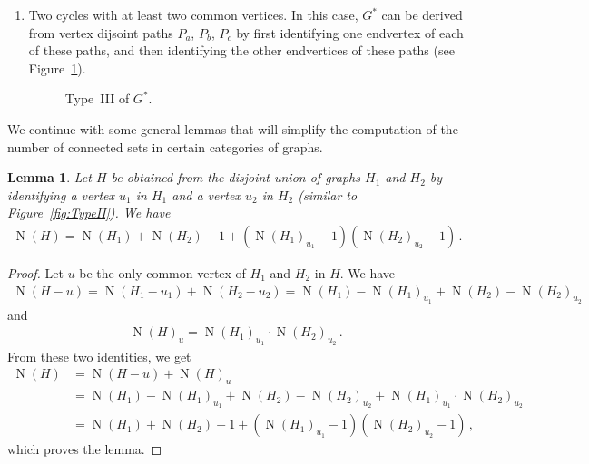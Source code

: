 \documentclass[a4paper,12pt]{amsart}
\newtheorem{lemma}{Lemma}
\theoremstyle{remark}
\DeclareMathOperator{\N}{N}
\begin{document}
\begin{enumerate}
\medskip
\item [{\bf Type~III}:] Two cycles with at least two common vertices. In this case, $G^*$ can be derived from vertex dijsoint paths $P_a$, $P_b$, $P_c$ by first identifying one endvertex of each of these paths, and then identifying the other endvertices of these paths (see Figure~\ref{fig:TypeIII}).
\begin{figure}[h]
	\begin{center}
	\end{center}
	\caption{Type~III of $G^*$.} \label{fig:TypeIII}
\end{figure}
\end{enumerate}

\medskip
We continue with some general lemmas that will simplify the computation of the number of connected sets in certain categories of graphs.

\begin{lemma}\label{Lem:identify}
Let $H$ be obtained from the disjoint union of graphs $H_1$ and $H_2$ by identifying a vertex $u_1$ in $H_1$ and a vertex $u_2$ in $H_2$ (similar to Figure~\ref{fig:TypeII}). We have
\begin{align*}
\N(H)=\N(H_1)+\N(H_2) -1 + (\N(H_1)_{u_1} -1 )(\N(H_2)_{u_2} -1 )\,.
\end{align*}
\end{lemma}

\begin{proof}
Let $u$ be the only common vertex of $H_1$ and $H_2$ in $H$. We have
\begin{align*}
\N(H-u)=\N(H_1-u_1)+\N(H_2-u_2)=\N(H_1)-\N(H_1)_{u_1} + \N(H_2)-\N(H_2)_{u_2}
\end{align*}
and 
\begin{align*}
\N(H)_u=\N(H_1)_{u_1}\cdot \N(H_2)_{u_2}\,.
\end{align*}
From these two identities, we get
\begin{align*}
\N(H)&=\N(H-u)+\N(H)_u\\
&=\N(H_1)-\N(H_1)_{u_1} + \N(H_2)-\N(H_2)_{u_2}+\N(H_1)_{u_1}\cdot \N(H_2)_{u_2}\\
&=\N(H_1)+\N(H_2) -1 + (\N(H_1)_{u_1} -1 )(\N(H_2)_{u_2} -1 )\,,
\end{align*}
which proves the lemma.
\end{proof}
\end{document}
